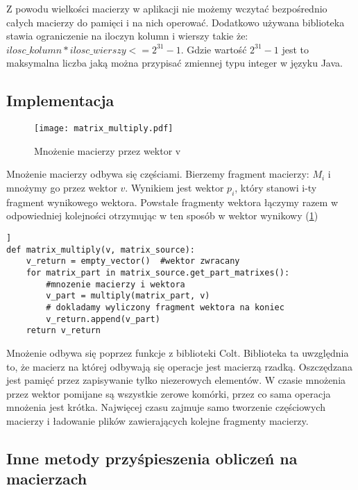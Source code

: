 Z powodu wielkości macierzy w aplikacji nie możemy wczytać bezpośrednio całych macierzy do pamięci i na nich operować. Dodatkowo używana biblioteka stawia ograniczenie na iloczyn kolumn i wierszy takie że: $ilosc\_kolumn * ilosc\_wierszy <= 2^{31}-1$.  Gdzie wartość $2^{31}-1$ jest to maksymalna liczba jaką można przypisać zmiennej typu integer w języku Java. 



\subsection*{Implementacja}

\begin{figure}[htb]
\centering
\texttt{[image: matrix\_multiply.pdf]}
\caption{Mnożenie macierzy przez wektor v}
\label{fig:matrix_mult_fig}
\end{figure}

Mnożenie macierzy odbywa się częściami. Bierzemy fragment macierzy: $M_{i}$ i mnożymy go przez wektor $v$. Wynikiem jest wektor $p_i$, który stanowi i-ty fragment wynikowego wektora. Powstałe fragmenty wektora łączymy razem w odpowiedniej kolejności otrzymując w ten sposób w wektor wynikowy (\ref{fig:matrix_mult_fig})




\lstset{language=Python}
\begin{lstlisting}[frame=lines, caption={Mnożenie macierzy przez wektor v}, label={list:matrix_mult_fig}] ]
def matrix_multiply(v, matrix_source):
	v_return = empty_vector()  #wektor zwracany
	for matrix_part in matrix_source.get_part_matrixes():
		#mnozenie macierzy i wektora
		v_part = multiply(matrix_part, v) 
		# dokladamy wyliczony fragment wektora na koniec
		v_return.append(v_part)   
	return v_return 
\end{lstlisting}

Mnożenie odbywa się poprzez funkcje z biblioteki Colt. Biblioteka ta uwzględnia to, że macierz na której odbywają się operacje jest macierzą rzadką. Oszczędzana jest pamięć przez zapisywanie tylko niezerowych elementów. W czasie mnożenia przez wektor pomijane są wszystkie zerowe komórki, przez co sama operacja mnożenia jest krótka. Najwięcej czasu zajmuje samo tworzenie częściowych  macierzy i ładowanie plików zawierających kolejne fragmenty macierzy. 


\subsection{Inne metody przyśpieszenia obliczeń na macierzach}

